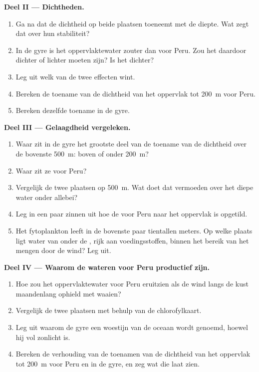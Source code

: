 \begin{problem}
\medskip
\noindent\textbf{Deel II --- Dichtheden.}
\begin{enumerate}[resume]
  \item Ga na dat de dichtheid op beide plaatsen toeneemt met de diepte. Wat
        zegt dat over hun stabiliteit?
  \item In de gyre is het oppervlaktewater zouter dan voor Peru. Zou het daardoor
        dichter of lichter moeten zijn? Is het dichter?
  \item Leg uit welk van de twee effecten wint.
  \item Bereken de toename van de dichtheid van het oppervlak tot \qty{200}{m}
        voor Peru.
  \item Bereken dezelfde toename in de gyre.
\end{enumerate}

\medskip
\noindent\textbf{Deel III --- Gelaagdheid vergeleken.}
\begin{enumerate}[resume]
  \item Waar zit in de gyre het grootste deel van de toename van de dichtheid
        over de bovenste \qty{500}{m}: boven of onder \qty{200}{m}?
  \item Waar zit ze voor Peru?
  \item Vergelijk de twee plaatsen op \qty{500}{m}. Wat doet dat vermoeden over
        het diepe water onder allebei?
  \item Leg in een paar zinnen uit hoe de  voor Peru naar het
        oppervlak is opgetild.
  \item Het fytoplankton leeft in de bovenste paar tientallen meters. Op welke
        plaats ligt water van onder de , rijk aan voedingsstoffen,
        binnen het bereik van het mengen door de wind? Leg uit.
\end{enumerate}

\medskip
\noindent\textbf{Deel IV --- Waarom de wateren voor Peru productief zijn.}
\begin{enumerate}[resume]
  \item Hoe zou het oppervlaktewater voor Peru eruitzien als de wind langs de
        kust maandenlang ophield met waaien?
  \item Vergelijk de twee plaatsen met behulp van de chlorofylkaart.
  \item Leg uit waarom de gyre een woestijn van de oceaan wordt genoemd, hoewel
        hij vol zonlicht is.
  \item Bereken de verhouding van de toenamen van de dichtheid van het oppervlak
        tot \qty{200}{m} voor Peru en in de gyre, en zeg wat die laat zien.
\end{enumerate}
\end{problem}
